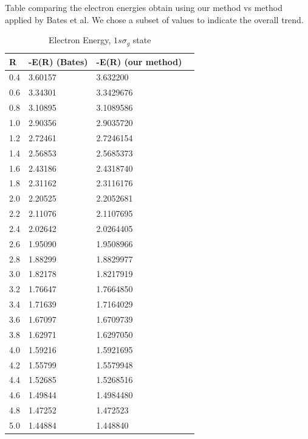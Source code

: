 Table comparing the electron  energies obtain using our method vs method applied by Bates et al. We chose a subset of values to indicate the overall trend.

  \begin{table}[ht]
  \caption{Electron Energy, $ 1s\sigma_g $ state}
  \centering
  \label{tab:UsVsBates}
    \begin{tabular}{ m{4em} m{4em}  m{4em}  m{4em} }
      \hline
      R & -E(R) (Bates) & -E(R) (our method)  \\ \hline \hline
      0.4 & 3.60157 & 3.632200 \\
      0.6 & 3.34301 & 3.3429676 \\
      0.8 & 3.10895 & 3.1089586 \\
      1.0 & 2.90356 & 2.9035720 \\
      1.2 & 2.72461 & 2.7246154 \\
      1.4 & 2.56853 & 2.5685373 \\
      1.6 & 2.43186 & 2.4318740 \\
      1.8 & 2.31162 & 2.3116176 \\
      2.0 & 2.20525 & 2.2052681 \\
      2.2 & 2.11076 & 2.1107695 \\ 
      2.4 & 2.02642 & 2.0264405 \\
      2.6 & 1.95090 & 1.9508966 \\
      2.8 & 1.88299 & 1.8829977 \\
      3.0 & 1.82178 & 1.8217919 \\
      3.2 & 1.76647 & 1.7664850 \\
      3.4 & 1.71639 & 1.7164029 \\
      3.6 & 1.67097 & 1.6709739 \\
      3.8 & 1.62971 & 1.6297050 \\
      4.0 & 1.59216 & 1.5921695 \\
      4.2 & 1.55799 & 1.5579948 \\
      4.4 & 1.52685 & 1.5268516 \\
      4.6 & 1.49844 & 1.4984480 \\
      4.8 & 1.47252 & 1.472523 \\
      5.0 & 1.44884 & 1.448840 \\
      \hline
    \end{tabular}
  \end{table}
